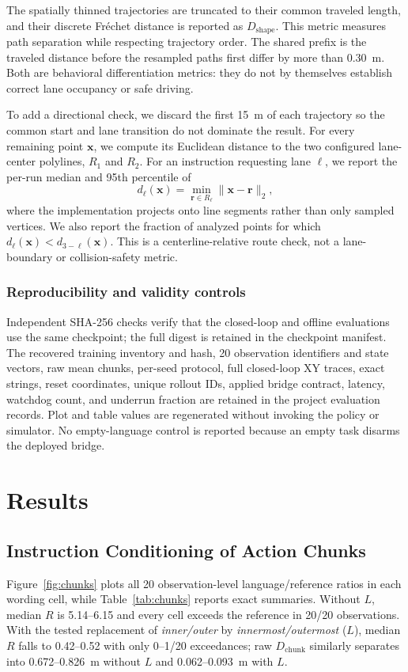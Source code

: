 \documentclass[letterpaper,conference]{IEEEtran}
\newcommand{\dchunk}{D_{\mathrm{chunk}}}
\newcommand{\dshape}{D_{\mathrm{shape}}}
\begin{document}
The spatially thinned trajectories are truncated to their common traveled
length, and their discrete Fr\'{e}chet distance is reported as
$\dshape$. This metric measures path separation while respecting trajectory
order. The shared prefix is the traveled distance before the resampled paths
first differ by more than 0.30~m. Both are behavioral differentiation metrics:
they do not by themselves establish correct lane occupancy or safe driving.

To add a directional check, we discard the first 15~m of each trajectory so
the common start and lane transition do not dominate the result. For every
remaining point $\mathbf{x}$, we compute its Euclidean distance to the two
configured lane-center polylines, $R_1$ and $R_2$. For an instruction requesting
lane $\ell$, we report the per-run median and 95th percentile of
\begin{equation}
d_\ell(\mathbf{x})=\min_{\mathbf{r}\in R_\ell}
\|\mathbf{x}-\mathbf{r}\|_2,
\label{eq:lane_distance}
\end{equation}
where the implementation projects onto line segments rather than only sampled
vertices. We also report the fraction of analyzed points for which
$d_\ell(\mathbf{x})<d_{3-\ell}(\mathbf{x})$. This is a centerline-relative route
check, not a lane-boundary or collision-safety metric.

\subsubsection{Reproducibility and validity controls}
Independent SHA-256 checks verify that the closed-loop and offline evaluations
use the same checkpoint; the full digest is retained in the checkpoint
manifest. The recovered training inventory and hash, 20 observation
identifiers and state vectors, raw mean chunks, per-seed protocol, full closed-loop XY
traces, exact strings, reset coordinates, unique rollout IDs, applied bridge
contract, latency, watchdog count, and underrun fraction are retained in the
project evaluation records. Plot and table values are regenerated without
invoking the policy or simulator. No empty-language control is reported because
an empty task disarms the deployed bridge.

\section{Results}
\subsection{Instruction Conditioning of Action Chunks}
Figure~\ref{fig:chunks} plots all 20 observation-level
language/reference ratios in each wording cell, while Table~\ref{tab:chunks}
reports exact summaries. Without $L$, median $R$ is 5.14--6.15 and every cell
exceeds the reference in 20/20 observations. With the tested replacement of
\emph{inner/outer} by \emph{innermost/outermost} ($L$), median $R$ falls to
0.42--0.52 with only 0--1/20 exceedances; raw $\dchunk$ similarly separates
into 0.672--0.826~m without $L$ and 0.062--0.093~m with $L$.
\end{document}
